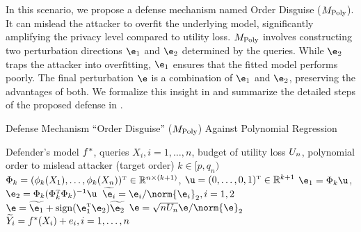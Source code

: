         
                
                
                

 
        In this scenario, we propose a defense mechanism named Order Disguise ($M_{\textrm{Poly}}$). It can mislead the attacker to overfit the underlying model, significantly amplifying the privacy level compared to utility loss. $M_{\textrm{Poly}}$ involves constructing two perturbation directions $\e_1$ and $\e_2$ determined by the queries. While $\e_2$ traps the attacker into overfitting, $\e_1$ ensures that the fitted model performs poorly. The final perturbation $\e$ is a combination of $\e_1$ and $\e_2$, preserving the advantages of both.
        We formalize this insight in  and summarize the detailed steps of the proposed defense in . 

        \begin{algorithm}[tb]
        \caption{Defense Mechanism ``Order Disguise'' ($M_{\textrm{Poly}}$) Against Polynomial Regression}\label{alg:poly}
        \begin{algorithmic}[1]
            \Require Defender's model $f^*$, queries $X_i, i=1, \ldots ,n$, budget of utility loss $U_n$, polynomial order to mislead attacker (target order) $k \in [p, q_n)$
            \State $\Phi_k = (\phi_k(X_1), \ldots, \phi_k(X_n))^{ \mathrm{\scriptscriptstyle T} } \in \mathbb{R}^{n\times(k+1)}$, $\u=(0,\ldots,0,1)^\T \in \Real^{k+1}$
            \State $\e_1 = \Phi_k \u$, $\e_2 = \Phi_k (\Phi_k^\T \Phi_k)^{-1} \u$ 
            \State $\tilde{\e_i} = \e_i/\norm{\e_i}_2, i=1,2$
            \State $\e = \tilde{\e_1} + \sign(\e_1^\T\e_2) \tilde{\e_2}$ 
            \State $\e = \sqrt{n \Ul_n} \e / \norm{\e}_2$ 
            \Ensure $\widetilde{Y}_i = f^*(X_i) + e_i, i=1, \ldots ,n$
        \end{algorithmic}
        \end{algorithm}    
        
